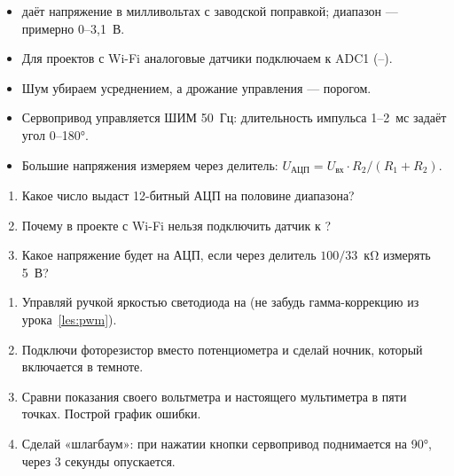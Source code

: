 \begin{summary}
\begin{itemize}[leftmargin=*]
  \item {} даёт напряжение в милливольтах с заводской поправкой; диапазон --- примерно 0--3,1~В.
  \item Для проектов с Wi-Fi аналоговые датчики подключаем к ADC1 (--).
  \item Шум убираем усреднением, а дрожание управления --- порогом.
  \item Сервопривод управляется ШИМ 50~Гц: длительность импульса 1--2~мс задаёт угол 0--180°.
  \item Большие напряжения измеряем через делитель: $U_\text{АЦП} = U_\text{вх}\cdot R_2/(R_1+R_2)$.
\end{itemize}
\end{summary}

\begin{quiz}
\begin{enumerate}
  \item Какое число выдаст 12-битный АЦП на половине диапазона?
  \item Почему в проекте с Wi-Fi нельзя подключить датчик к ?
  \item Какое напряжение будет на АЦП, если через делитель $100/33$~к\si{\ohm} измерять 5~В?
\end{enumerate}
\end{quiz}

\begin{tasks}
\begin{enumerate}
  \item Управляй ручкой яркостью светодиода на  (не забудь гамма-коррекцию из урока~\ref{les:pwm}).
  \item Подключи фоторезистор вместо потенциометра и сделай ночник, который включается в темноте.
  \item Сравни показания своего вольтметра и настоящего мультиметра в пяти точках. Построй график ошибки.
  \item Сделай «шлагбаум»: при нажатии кнопки сервопривод поднимается на 90°, через 3 секунды опускается.
\end{enumerate}
\end{tasks}
